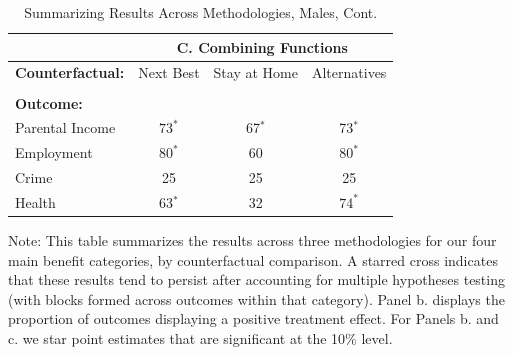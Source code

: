 \documentclass[static]{JJH-Beamer}
\begin{document}
\clearpage

\begin{frame}
 \addtocounter{framenumber}{-1}

\begin{table}[H]\addtocounter{table}{-1}
\caption{Summarizing Results Across Methodologies, Males, Cont.}
\begin{center}
\begin{tabular}{lccc}
\toprule
& \multicolumn{3}{c}{\textbf{C. Combining Functions}} \\
 \midrule
 \textbf{Counterfactual:} & Next Best & Stay at Home & Alternatives  \\ \\
 \textbf{Outcome:} & \\
Parental Income &  $73^*$ & 67$^*$ & 73$^*$  \\
Employment & $80^*$ & 60& $80^*$  \\
Crime & 25 & 25 & 25  \\
Health &  63$^*$ & 32 & $74^*$   \\
\bottomrule
\end{tabular}
\end{center}
\tiny\flushleft Note: This table summarizes the results across three methodologies for our four main benefit categories, by counterfactual comparison. A starred cross indicates that these results tend to persist after accounting for multiple hypotheses testing (with blocks formed across outcomes within that category). Panel b. displays the proportion of outcomes displaying a positive treatment effect. For Panels b. and c. we star point estimates that are significant at the 10\% level.\\
\end{table}

\end{frame}
\end{document}
